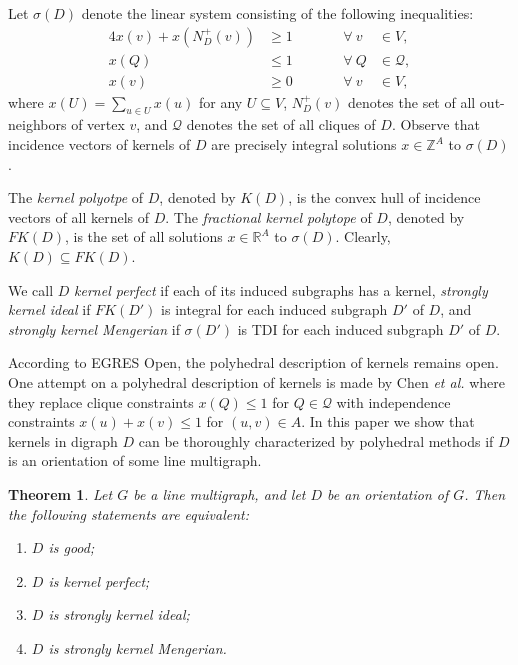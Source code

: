 \documentclass[11pt]{article}
\newtheorem{theorem}{Theorem}%
\numberwithin{theorem}{section}
\begin{document}
Let $\sigma(D)$ denote the linear system consisting of the following inequalities:
\begin{alignat}{4}
x(v)+x(N^+_{D}(v)) &\geq 1 &\qquad &\forall ~ v~&\in V, \label{domination constraints}\\
x(Q)&\leq 1 &\qquad &\forall ~ Q &\in \mathcal{Q}, \label{independence constraints}\\
x(v) &\geq 0 &\qquad &\forall ~ v~&\in V, \label{vertex nonnegativity}
\end{alignat}
where $x(U)=\sum_{u\in U}x(u)$ for any $U\subseteq V$, $N_D^+(v)$ denotes the set of all out-neighbors of vertex $v$, and $\mathcal{Q}$ denotes the set of all cliques of $D$. Observe that incidence vectors of kernels of $D$ are precisely integral solutions $x\in \mathbb{Z}^A$ to $\sigma(D)$.

The \textit{kernel polyotpe} of $D$, denoted by $K(D)$, is the convex hull of incidence vectors of all kernels of $D$.  The \textit{fractional kernel polytope} of $D$, denoted by $FK(D)$, is the set of all solutions $x\in \mathbb{R}^A$ to $\sigma(D)$. Clearly, $K(D)\subseteq FK(D)$.

We call $D$ \textit{kernel perfect} if each of its induced subgraphs has a kernel, \textit{strongly kernel ideal} if $FK(D')$ is integral for each induced subgraph $D'$ of $D$, and \textit{strongly kernel Mengerian} if $\sigma(D')$ is TDI for each induced subgraph $D'$ of $D$.

According to EGRES Open, the polyhedral description of kernels remains open. One attempt on a polyhedral description of kernels is made by Chen \textit{et al.} \cite{ChenChen16} where they replace clique constraints $x(Q)\leq 1$ for $Q\in\mathcal{Q}$ with independence constraints $x(u)+x(v)\leq 1$ for $(u,v)\in A$. In this paper we show that kernels in digraph $D$ can be thoroughly characterized by polyhedral methods if $D$ is an orientation of some line multigraph.

\begin{theorem}
\label{thm:main}
Let $G$ be a line multigraph, and let $D$ be an orientation of $G$. Then the following statements are equivalent:
\begin{enumerate}[label={\emph{(}\roman*\emph{)}}]
	\item $D$ is good;
	\item $D$ is kernel perfect;
	\item $D$ is strongly kernel ideal;
	\item $D$ is strongly kernel Mengerian.
\end{enumerate}
\end{theorem}
\end{document}
